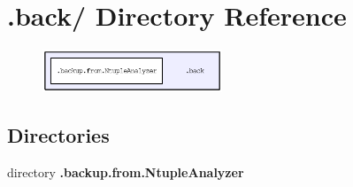 \section{.back/ Directory Reference}
\label{dir_13868ebd63c672adf95c4bc2e4afc08f}


\begin{figure}[H]
\begin{center}
\leavevmode
\includegraphics[width=152pt]{dir_13868ebd63c672adf95c4bc2e4afc08f_dep}
\end{center}
\end{figure}
\subsection*{Directories}
\begin{CompactItemize}
\item 
directory \bf{.backup.from.Ntuple\-Analyzer}
\end{CompactItemize}
